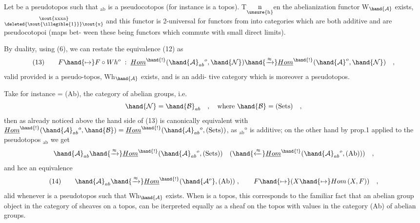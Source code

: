 
 Let  be a pseudotopos such that $_{\mathrm{ab}}$ is a pseudocotopos
(for instance  is a topos). T\(\underset{\unsure{\text{h}}}{\text{n}}\)en the abelianization functor W$_{\hand{\mathcal{A}}}$
exists, \(\substack{\text{\xout{xxxa}}\\\text{\deleted{\xout{\illegible{1}}}\xout{x}}}\) and this functor is 2-universal for functors from  into
categories  which are both additive and are pseudocotopoi (maps bet-%
ween these being functors which commute with small direct limits).

By duality, using (6), we can restate the equivalence (12) as
\[ (13) \qquad F \hand{\mapsto} F\circ Wh^{o} \; : \; \underline{Hom}^{\hand{!}}(\hand{\mathcal{A}}_{ab}{}^{o},\hand{\mathcal{N}}) \hand{\xrightarrow{\approx}} \underline{Hom}^{\hand{!}}(\hand{\mathcal{A}}^{o},\hand{\mathcal{N}}) \quad , \]
valid provided   is a pseudo-topos, Wh$_{\hand{\mathcal{A}}}$ exists, and  is an addi-%
tive category which is moreover a pseudotopos.

Take for instance  = (Ab), the category of abelian groups, i.e.
\[ \hand{\mathcal{N}} = \hand{\mathcal{B}}_{ab} \quad , \quad \text{where } \hand{\mathcal{B}} = \text{(Sets)} \quad , \]
then as already noticed above the   hand side of (13) is canonically
equivalent with $\underline{Hom}^{\hand{!}}(\hand{\mathcal{A}}_{ab}{}^{o},\hand{\mathcal{B}}) = \underline{Hom}^{\hand{!}}(\hand{\mathcal{A}}_{ab}{}^{o}, \text{(Sets)})$, as $_{\mathrm{ab}}{}^{\mathrm{o}}$ is
additive; on the other hand by prop.1 applied to the pseudotopos $_{\mathrm{ab}}$
we get
\[ \hand{\mathcal{A}}_{ab} \hand{\xrightarrow{\approx}} \underline{Hom}^{\hand{!}}(\hand{\mathcal{A}}_{ab}{}^{o}, \text{(Sets)}) \quad ( \hand{\xleftarrow{\approx}} \underline{Hom}^{\hand{!}}(\hand{\mathcal{A}}_{ab}{}^{o}, \text{(Ab)}) ) \quad , \]
and hce an equivalence
\[ (14) \qquad \hand{\mathcal{A}}_{ab} \hand{\xrightarrow{\approx}} \underline{Hom}^{\hand{!}}(\hand{\mathcal{A}^{o}}, \text{(Ab)}) \; , \qquad F \hand{\mapsto} ( X \hand{\mapsto} Hom\,(X,F)) \quad , \]
alid whenever  is a pseudotopos such that Wh$_{\hand{\mathcal{A}}}$ exists. When  is a
topos, this corresponds to the familiar fact that an abelian group object
in the category of sheaves  on a topos, can be iterpreted equally as a
sheaf on the topos with values in the category (Ab) of abelian groups.

